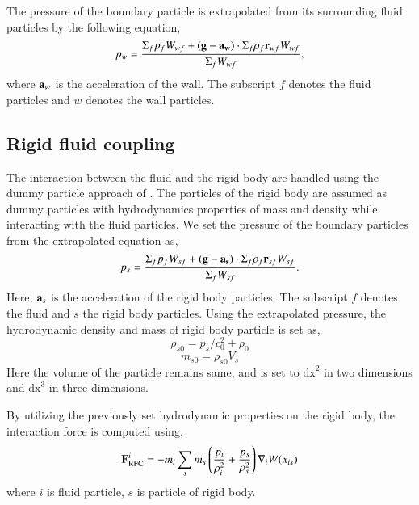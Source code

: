 The pressure of the boundary particle is extrapolated from its surrounding
fluid particles by the following equation,
\begin{equation}
  \label{eq:pressure-bc}
  p_w = \frac{\Sigma_f p_f W_{wf} + (\mathbf{g} - \mathbf{a}_{\mathbf{w}}) \cdot \Sigma_f
    \rho_f \mathbf{r}_{wf} W_{wf}}{\Sigma_f W_{wf}},
\end{equation}
where $\mathbf{a}_w$ is the acceleration of the wall. The subscript $f$ denotes
the fluid particles and $w$ denotes the wall particles.

\FloatBarrier%
\subsection{Rigid fluid coupling}\label{subsec:rfc}
The interaction between the fluid and the rigid body are handled using the dummy
particle approach of \citep{Adami2012}. The particles of the rigid body are
assumed as dummy particles with hydrodynamics properties of mass and density
while interacting with the fluid particles. We set the pressure of the boundary
particles from the extrapolated equation \citep{Adami2012} as,
\begin{equation}
  \label{eq:pressure-bc}
  p_s = \frac{\Sigma_f p_f W_{sf} + (\mathbf{g} - \mathbf{a}_{\mathbf{s}}) \cdot \Sigma_f
    \rho_f \mathbf{r}_{sf} W_{sf}}{\Sigma_f W_{sf}}.
\end{equation}
Here, $\mathbf{a}_s$ is the acceleration of the rigid body particles. The
subscript $f$ denotes the fluid and $s$ the rigid body particles. Using the
extrapolated pressure, the hydrodynamic density and mass of rigid body
particle is set as,
\begin{equation}
  \label{eq:pressure-bc}
  \rho_{s0} = p_s / c_0^2 + \rho_0
\end{equation}
\begin{equation}
  \label{eq:pressure-bc}
  m_{s0} = \rho_{s0} V_{s}
\end{equation}
Here the volume of the particle remains same, and is set to $\text{dx}^2$ in two
dimensions and $\text{dx}^3$ in three dimensions.

By utilizing the previously set hydrodynamic properties on the rigid body, the
interaction force is computed using,
\begin{equation}
  \mathbf{F}_{\text{RFC}}^i = -m_i \sum_{s} m_s \left(\frac{p_i}{\rho_{i}^2} +
  \frac{p_s}{\rho_{s}^2} \right) \nabla_{i} W(x_{is})
\end{equation}
where $i$ is fluid particle, $s$ is particle of rigid body.


